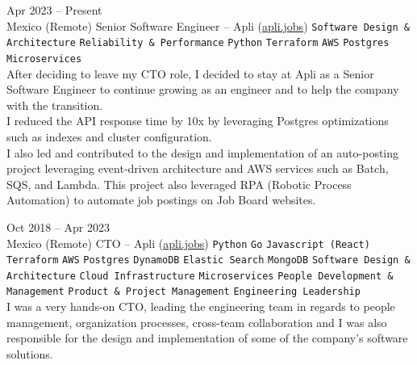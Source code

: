 \documentclass[9pt]{developercv} %
\begin{document}
\begin{entrylist}
    \entry
        {
            Apr 2023 -- Present
            \\\footnotesize{Mexico (Remote)}
        }
        {Senior Software Engineer – Apli ({\href{https://apli.jobs/}{\underline{apli.jobs}}}) }
        {
            \texttt{Software Design \& Architecture}
            \slashsep\texttt{Reliability \& Performance}
            \slashsep\texttt{Python}
            \slashsep\texttt{Terraform}
            \slashsep\texttt{AWS}
            \slashsep\texttt{Postgres}
            \slashsep\texttt{Microservices}
        }
        {\\
            After deciding to leave my CTO role, I decided to stay at Apli as a Senior Software 
            Engineer to continue growing as an engineer and to help the company with the transition.\\

            I reduced the API response time by 10x by leveraging Postgres optimizations such as 
            indexes and cluster configuration.\\

            I also led and contributed to the design and implementation of an auto-posting project
            leveraging event-driven architecture and AWS services such as Batch, SQS, and Lambda. 
            This project also leveraged RPA (Robotic Process Automation) to automate job postings on
            Job Board websites.
        }

    \entry
        {
            Oct 2018 -- Apr 2023
            \\\footnotesize{Mexico (Remote)}
        }
        {CTO – Apli ({\href{https://apli.jobs/}{\underline{apli.jobs}}}) }
        {
            \texttt{Python}
            \slashsep\texttt{Go}
            \slashsep\texttt{Javascript (React)}
            \slashsep\texttt{Terraform}
            \slashsep\texttt{AWS}
            \slashsep\texttt{Postgres}
            \slashsep\texttt{DynamoDB}
            \slashsep\texttt{Elastic Search}
            \slashsep\texttt{MongoDB}
            \slashsep\texttt{Software Design \& Architecture}
            \slashsep\texttt{Cloud Infrastructure}
            \slashsep\texttt{Microservices}
            \slashsep\texttt{People Development \& Management}
            \slashsep\texttt{Product \& Project Management}
            \slashsep\texttt{Engineering Leadership}
        }
        {\\
            I was a very hands-on CTO, leading the engineering team in regards to people management,
            organization processes, cross-team collaboration and I was also responsible for the 
            design and implementation of some of the company's software solutions.\\

}
\end{entrylist}
\end{document}
